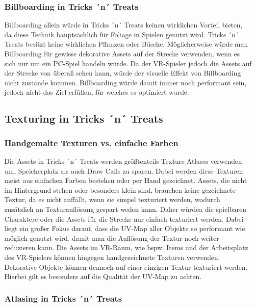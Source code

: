 \subsubsection{Billboarding in Tricks ´n´ Treats}
Billboarding allein würde in Tricks ´n´ Treats keinen wirklichen Vorteil bieten, da diese Technik hauptsächlich für Foliage in Spielen genutzt wird. Tricks ´n´ Treats besitzt keine wirklichen Pflanzen oder Büsche. Möglicherweise würde man Billboarding für gewisse dekorative Assets auf der Strecke verwenden, wenn es sich nur um ein PC-Spiel handeln würde. Da der VR-Spieler jedoch die Assets auf der Strecke von überall sehen kann, würde der visuelle Effekt von Billboarding nicht zustande kommen. Billboarding würde damit immer noch performant sein, jedoch nicht das Ziel erfüllen, für welches es optimiert wurde. 

\subsection{Texturing in Tricks ´n´ Treats}

\subsubsection{Handgemalte Texturen vs. einfache Farben}

Die Assets in Tricks ´n´ Treats werden größtenteils Texture Atlases verwenden um, Speicherplatz als auch Draw Calls zu sparen. Dabei werden diese Texturen meist aus einfachen Farben bestehen oder per Hand gezeichnet. Assets, die nicht im Hintergrund stehen oder besonders klein sind, brauchen keine gezeichnete Textur, da es nicht auffällt, wenn sie simpel texturiert werden, wodurch zusätzlich an Texturauflösung gespart weden kann. Daher würden die spielbaren Charaktere oder die Assets für die Strecke nur einfach texturiert werden. Dabei liegt ein großer Fokus darauf, dass die UV-Map aller Objekte so performant wie möglich genutzt wird, damit man die Auflösung der Textur noch weiter reduzieren kann.
Die Assets im VR-Raum, wie bspw. Items und der Arbeitsplatz des VR-Spielers können hingegen handgezeichnete Texturen verwenden. Dekorative Objekte können dennoch auf einer einzigen Textur texturiert werden. Hierbei gilt es besonders auf die Qualität der UV-Map zu achten.

\subsubsection{Atlasing in Tricks ´n´ Treats}

